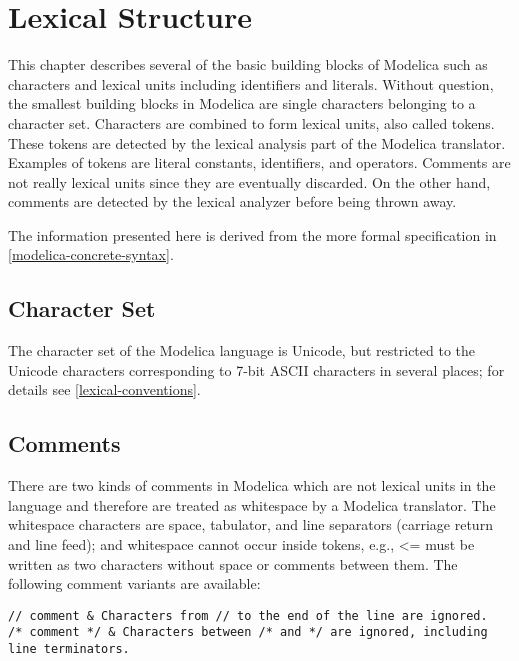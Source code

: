 \chapter{Lexical Structure}

This chapter describes several of the basic building blocks of Modelica
such as characters and lexical units including identifiers and literals.
Without question, the smallest building blocks in Modelica are single
characters belonging to a character set. Characters are combined to form
lexical units, also called tokens. These tokens are detected by the
lexical analysis part of the Modelica translator. Examples of tokens are
literal constants, identifiers, and operators. Comments are not really
lexical units since they are eventually discarded. On the other hand,
comments are detected by the lexical analyzer before being thrown away.

The information presented here is derived from the more formal
specification in \autoref{modelica-concrete-syntax}.

\section{Character Set}

The character set of the Modelica language is Unicode, but restricted to
the Unicode characters corresponding to 7-bit ASCII characters in
several places; for details see \autoref{lexical-conventions}.

\section{Comments}

There are two kinds of comments in Modelica which are not lexical units
in the language and therefore are treated as whitespace by a Modelica
translator. The whitespace characters are space, tabulator, and line
separators (carriage return and line feed); and whitespace cannot occur
inside tokens, e.g., \textless{}= must be written as two characters
without space or comments between them.  The following comment variants are
available:
\begin{lstlisting}[language=modelica]
// comment & Characters from // to the end of the line are ignored.
/* comment */ & Characters between /* and */ are ignored, including line terminators.
\end{lstlisting}

